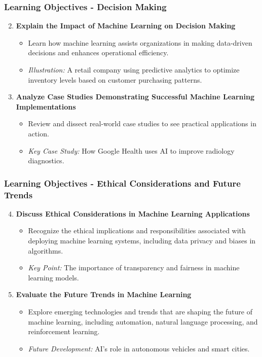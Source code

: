 \documentclass{beamer}
\begin{document}
\begin{frame}[fragile]
    \frametitle{Learning Objectives - Decision Making}
    \begin{enumerate}
        \setcounter{enumi}{1}
        \item \textbf{Explain the Impact of Machine Learning on Decision Making}
        \begin{itemize}
            \item Learn how machine learning assists organizations in making data-driven decisions and enhances operational efficiency.
            \item \textit{Illustration:} A retail company using predictive analytics to optimize inventory levels based on customer purchasing patterns.
        \end{itemize}

        \item \textbf{Analyze Case Studies Demonstrating Successful Machine Learning Implementations}
        \begin{itemize}
            \item Review and dissect real-world case studies to see practical applications in action.
            \item \textit{Key Case Study:} How Google Health uses AI to improve radiology diagnostics.
        \end{itemize}
    \end{enumerate}
\end{frame}

\begin{frame}[fragile]
    \frametitle{Learning Objectives - Ethical Considerations and Future Trends}
    \begin{enumerate}
        \setcounter{enumi}{3}
        \item \textbf{Discuss Ethical Considerations in Machine Learning Applications}
        \begin{itemize}
            \item Recognize the ethical implications and responsibilities associated with deploying machine learning systems, including data privacy and biases in algorithms.
            \item \textit{Key Point:} The importance of transparency and fairness in machine learning models.
        \end{itemize}

        \item \textbf{Evaluate the Future Trends in Machine Learning}
        \begin{itemize}
            \item Explore emerging technologies and trends that are shaping the future of machine learning, including automation, natural language processing, and reinforcement learning.
            \item \textit{Future Development:} AI's role in autonomous vehicles and smart cities.
        \end{itemize}
    \end{enumerate}
\end{frame}
\end{document}
